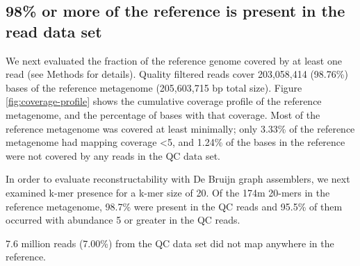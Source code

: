 \documentclass[10pt,a4paper,twocolumn]{article}
\begin{document}


\subsection*{98\% or more of the reference is present in the read data set}

We next evaluated the fraction of the reference genome covered by at least
one read (see Methods for details). Quality filtered reads cover
203,058,414 (98.76\%) bases of the reference metagenome (205,603,715
bp total size).  Figure \ref{fig:coverage-profile} shows the
cumulative coverage profile of the reference metagenome, and the
percentage of bases with that coverage. Most of the reference
metagenome was covered at least minimally; only 3.33\% of the
reference metagenome had mapping coverage \textless 5, and 1.24\% of
the bases in the reference were not covered by any reads in the QC data
set.

In order to evaluate reconstructability with De Bruijn graph
assemblers, we next examined k-mer presence for a k-mer size of 20. Of
the 174m 20-mers in the reference metagenome, 98.7\% were present in the
QC reads and 95.5\% of them occurred with abundance 5 or greater in
the QC reads.


7.6 million reads (7.00\%) from the QC data set did not map anywhere in
the reference.
\end{document}
